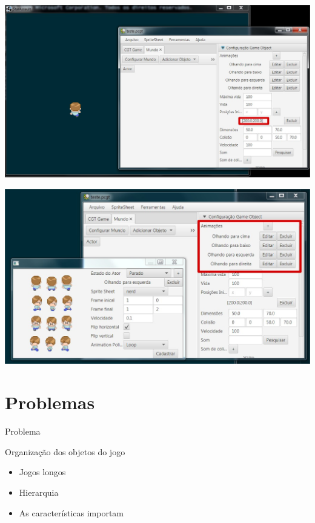 \documentclass{beamer}
\begin{document}
   \begin{frame}
      \includegraphics[width=\textwidth]{images/problema-1.jpg}
   \end{frame}

   \begin{frame}
      \includegraphics[width=\textwidth]{images/problema-2.jpg}
   \end{frame}

   \section{Problemas}
   \begin{frame}{Problema}
      \begin{block}{Organização dos objetos do jogo}
         \begin{itemize}
            \item<+-> Jogos longos
            \item<+-> Hierarquia
            \item<+-> As características importam
         \end{itemize}
      \end{block}
   \end{frame}
\end{document}
